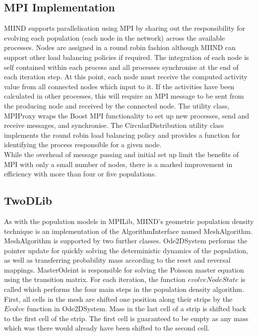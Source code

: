 \documentclass[utf8]{frontiers_suppmat} %
\begin{document}
\subsection{MPI Implementation}
MIIND supports parallelisation using MPI by sharing out the responsibility for evolving each population (each node in the network) across the available processes. Nodes are assigned in a round robin fashion although MIIND can support other load balancing policies if required. The integration of each node is self contained within each process and all processes synchronise at the end of each iteration step. At this point, each node must receive the computed activity value from all connected nodes which input to it. If the activities have been calculated in other processes, this will require an MPI message to be sent from the producing node and received by the connected node. The utility class, MPIProxy wraps the Boost MPI functionality to set up new processes, send and receive messages, and synchronise. The CircularDistribution utility class implements the round robin load balancing policy and provides a function for identifying the process responsible for a given node. \\
While the overhead of message passing and initial set up limit the benefits of MPI with only a small number of nodes, there is a marked improvement in efficiency with more than four or five populations.\\

\subsection{TwoDLib}
As with the population models in MPILib, MIIND's geometric population density technique is an implementation of the AlgorithmInterface named MeshAlgorithm. MeshAlgorithm is supported by two further classes. Ode2DSystem performs the pointer update for quickly solving the deterministic dynamics of the population, as well as transferring probability mass according to the reset and reversal mappings. MasterOdeint is responsible for solving the Poisson master equation using the transition matrix. For each iteration, the function $evolveNodeState$ is called which performs the four main steps in the population density algorithm. \\
First, all cells in the mesh are shifted one position along their strips by the $Evolve$ function in Ode2DSystem. Mass in the last cell of a strip is shifted back to the first cell of the strip. The first cell is guaranteed to be empty as any mass which was there would already have been shifted to the second cell. \\
\end{document}
